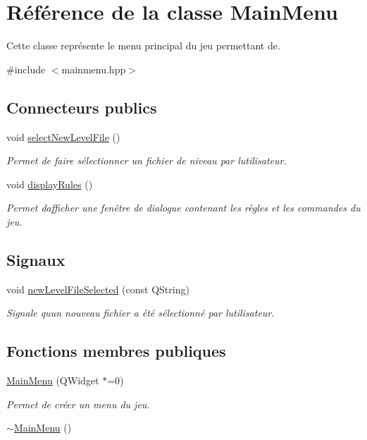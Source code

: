 \hypertarget{classMainMenu}{}\section{Référence de la classe Main\+Menu}
\label{classMainMenu}


Cette classe représente le menu principal du jeu permettant de.  




{\ttfamily \#include $<$mainmenu.\+hpp$>$}

\subsection*{Connecteurs publics}
\begin{DoxyCompactItemize}
\item 
void \hyperlink{classMainMenu_ab615dd0e5129bf9df28a1f493baad741}{select\+New\+Level\+File} ()
\begin{DoxyCompactList}\small\item\em Permet de faire sélectionner un fichier de niveau par l\textquotesingle{}utilisateur. \end{DoxyCompactList}\item 
void \hyperlink{classMainMenu_af449ad4f8eb0d941fb4e8bc2a352fc48}{display\+Rules} ()
\begin{DoxyCompactList}\small\item\em Permet d\textquotesingle{}afficher une fenêtre de dialogue contenant les règles et les commandes du jeu. \end{DoxyCompactList}\end{DoxyCompactItemize}
\subsection*{Signaux}
\begin{DoxyCompactItemize}
\item 
void \hyperlink{classMainMenu_acad34fb589f6f168930cbc1b89ccf7cb}{new\+Level\+File\+Selected} (const Q\+String)
\begin{DoxyCompactList}\small\item\em Signale qu\textquotesingle{}un nouveau fichier a été sélectionné par l\textquotesingle{}utilisateur. \end{DoxyCompactList}\end{DoxyCompactItemize}
\subsection*{Fonctions membres publiques}
\begin{DoxyCompactItemize}
\item 
\hyperlink{classMainMenu_a69707caeb524bd0600a0d05613108af5}{Main\+Menu} (Q\+Widget $\ast$=0)
\begin{DoxyCompactList}\small\item\em Permet de créer un menu du jeu. \end{DoxyCompactList}\item 
\hyperlink{classMainMenu_a0a19ddba3ac52bf39c09b579171c98f2}{$\sim$\+Main\+Menu} ()
\end{DoxyCompactItemize}
